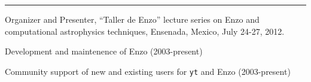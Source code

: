 
\rule[3pt]{363pt}{.1mm}

\medskip
\noindent Organizer and Presenter, ``Taller de Enzo'' lecture series on Enzo and
computational astrophysics techniques, Ensenada, Mexico, July 24-27, 2012.

\medskip
\noindent Development and maintenence of Enzo (2003-present)

\medskip 
\noindent Community support of new and existing users for {\tt yt} and Enzo
(2003-present)

\medskip
